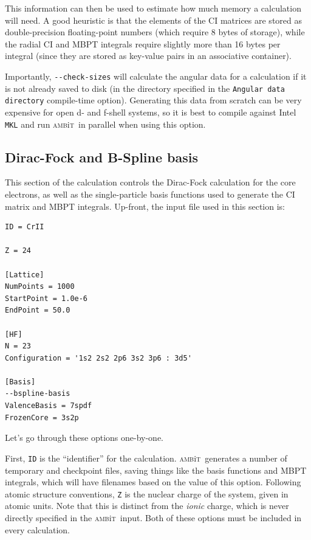 \documentclass{report}
\newcommand{\ambit}{\textsc{amb}{\footnotesize i}\textsc{t}}
\begin{document}
This information can then be used to estimate how much memory a calculation will need. A good heuristic
is that the elements of the CI matrices are stored as double-precision floating-point numbers
(which require 8 bytes of storage), while the radial CI and MBPT integrals require
slightly more than 16 bytes per integral (since they are stored as key-value pairs in an associative
container).

Importantly, \texttt{{-}{-}check-sizes} will calculate the angular data for a calculation if it is not
already saved to disk (in the directory specified in the \texttt{Angular data directory} compile-time
option). Generating this data from scratch can be very expensive for open d- and f-shell systems, so it
is best to compile against Intel \texttt{MKL} and run \ambit\  in parallel when using this option.

\subsection{Dirac-Fock and B-Spline basis}
\label{sec:tut_DF}

This section of the calculation controls the Dirac-Fock calculation for the core electrons, as well as
the single-particle basis functions used to generate the CI matrix and MBPT integrals. Up-front, the 
input file used in this section is:

\begin{verbatim}
ID = CrII

Z = 24

[Lattice]
NumPoints = 1000
StartPoint = 1.0e-6
EndPoint = 50.0

[HF]
N = 23
Configuration = '1s2 2s2 2p6 3s2 3p6 : 3d5'

[Basis]
--bspline-basis
ValenceBasis = 7spdf
FrozenCore = 3s2p
\end{verbatim}

Let's go through these options one-by-one. 

First, \texttt{ID} is the ``identifier'' for the calculation. \ambit\  generates a number of temporary
and checkpoint files, saving things like the basis functions and MBPT integrals, which will have
filenames based on the value of this option. Following atomic structure conventions, \texttt{Z} is the
nuclear charge of the system, given in atomic units. Note that this is distinct from the \textit{ionic}
charge, which is never directly specified in the \ambit\  input. Both of these options must be included
in every calculation.
\end{document}
